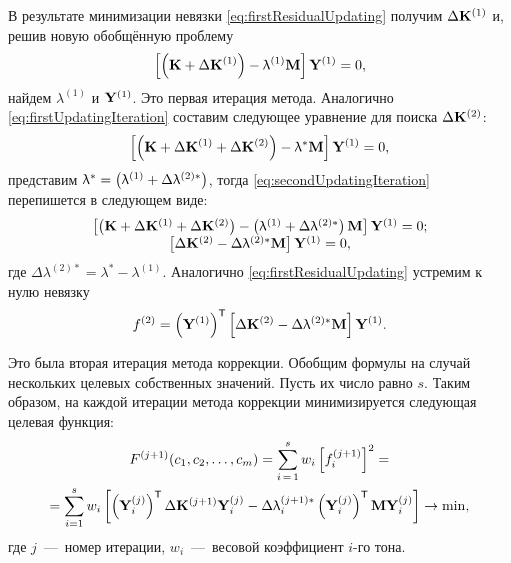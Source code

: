 В результате минимизации невязки \eqref{eq:firstResidualUpdating} получим $ \Delta \mathbf{K} ^ {(1)} $ и, решив новую обобщённую проблему
\begin{equation}
	\left[ \left( \mathbf{K} + \Delta \mathbf{K} ^ {(1)} \right) - \uplambda ^ {(1)} \mathbf{M} \right] \mathbf{Y} ^ {(1)} = 0,
\end{equation}
найдем $ \lambda ^ {(1)} $ и $ \mathbf{Y} ^ {(1)} $. Это первая итерация метода. Аналогично \eqref{eq:firstUpdatingIteration} составим следующее уравнение для поиска $ \Delta \mathbf{K} ^ {(2)} $:
\begin{equation}
	\left[ \left( \mathbf{K} + \Delta \mathbf{K} ^ {(1)} + \Delta \mathbf{K} ^ {(2)} \right) - \uplambda ^ \ast \mathbf{M} \right] \mathbf{Y} ^ {(1)} = 0,
	\label{eq:secondUpdatingIteration}
\end{equation}
представим $ \uplambda ^ \ast = \left( \uplambda ^ {(1)} + \Delta \uplambda ^ {(2) \ast} \right) $, тогда \eqref{eq:secondUpdatingIteration} перепишется в следующем виде:
\begin{equation}
	\begin{matrix}
		\left[ \left( \mathbf{K} + \Delta \mathbf{K} ^ {(1)} + \Delta \mathbf{K} ^ {(2)} \right) - \left( \uplambda ^ {(1)} + \Delta \uplambda ^ {(2) \ast} \right) \mathbf{M} \right] \mathbf{Y} ^ {(1)} = 0; \\
		\left[ \Delta \mathbf{K} ^ {(2)} - \Delta \uplambda ^ {(2) \ast} \mathbf{M} \right] \mathbf{Y} ^ {(1)} = 0,
	\end{matrix}
\end{equation}
где $ \Delta \lambda ^ {(2) \ast} = \lambda ^ \ast - \lambda ^ {(1)} $. Аналогично \eqref{eq:firstResidualUpdating} устремим к нулю невязку
\begin{equation}
	f ^ {(2)} = \left( \mathbf{Y} ^ {(1)} \right) ^ \mathsf{T} \left[ \Delta \mathbf{K} ^ {(2)} - \Delta \uplambda ^ {(2) \ast} \mathbf{M} \right] \mathbf{Y} ^ {(1)}.
\end{equation}

Это была вторая итерация метода коррекции. Обобщим формулы на случай нескольких целевых собственных значений. Пусть их число равно $ s $. Таким образом, на каждой итерации метода коррекции минимизируется следующая целевая функция:
\begin{gather}
	F ^ {(j + 1)}(c_1, c_2, \hdots, c_m) = \sum\limits_{i\,=\,1}^s w_i \left[ f_i ^ {(j + 1)} \right] ^ 2 = \nonumber \\
	= \sum\limits_{i = 1} ^ s w_i \left[ \left( \mathbf{Y}_i ^ {(j)} \right) ^ \mathsf{T} \Delta \mathbf{K} ^ {(j + 1)} \mathbf{Y}_i ^ {(j)} - \Delta \uplambda_i ^ {(j + 1) \ast} \left( \mathbf{Y}_i ^ {(j)} \right) ^ \mathsf{T} \mathbf{M} \mathbf{Y}_i ^ {(j)} \right] \rightarrow \min,
	\label{eq:objFunUpdating}
\end{gather}
где $ j $~---~номер итерации, $ w_i $~---~весовой коэффициент $ i $-го тона.


